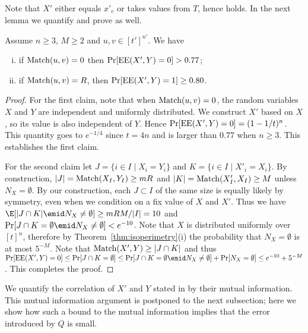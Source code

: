 Note that $X'$ either equals $x'_e$ or takes values from $T$,
hence  holds. In the next lemma we quantify and
prove  as well.

\begin{lemma}
\label{lem:error}
Assume $n\ge3$, $M\ge2$ and $u,v\in[t']^{n'}$. We have
\begin{enumerate}[(i)]
\item 
if $\operatorname{Match}(u,v)=0$ then $\Pr[\operatorname{EE}(X',Y)=0] > 0.77$;
\item 
if $\operatorname{Match}(u,v)=R$, then
$\Pr[\operatorname{EE}(X', Y)=1] \ge 0.80$.
\end{enumerate}
\end{lemma}

\begin{proof}
For the first claim, note that when $\operatorname{Match}(u,v) = 0$, the
random variables $X$ and $Y$ are independent and uniformly
distributed. We construct $X'$ based on $X$, so its value is
also independent of $Y$. Hence $\Pr[\operatorname{EE}(X',Y)=0]=(1-1/t)^n$.
This quantity goes to $e^{-1/4}$ since $t=4n$ and is larger than
$0.77$ when $n\geq 3$. This establishes the first claim.

For the second claim let $J = \{i\in I\mid X_i=Y_i\}$ and
$K=\{i\in I\mid X'_i = X_i\}$. By construction,
$|J|=\operatorname{Match}(X_{I},Y_{I})\ge mR$ and $|K|=\operatorname{Match}(X'_{I}, X_I)
\geq M$ unless $N_X=\emptyset$. By our construction, each
$J\subset I$ of the same size is equally likely by symmetry,
even when we condition on a fix value of $X$ and $X'$. Thus we
have $\E[|J\cap K|\emid N_X\ne\emptyset]\ge mRM/|I|=10$ and
$\Pr[J\cap K=\emptyset\emid N_X\ne\emptyset]<e^{-10}$. Note that
$X$ is distributed uniformly over $[t]^n$, therefore by
Theorem~\ref{thm:isoperimetry}(i) the probability that
$N_X=\emptyset$ is at most $5^{-M}$. Note that
$\operatorname{Match}(X',Y)\ge|J\cap K|$ and thus
$\Pr[\EE(X',Y)=0]\le\Pr[J\cap K=\emptyset]\le\Pr[J\cap
K=\emptyset\emid N_X\ne\emptyset] +\Pr[N_X=\emptyset]\le
e^{-10}+5^{-M}$. This completes the proof.
\end{proof}

We quantify the correlation of $X'$ and $Y$ stated in  
by their mutual information. This mutual information argument is
postponed to the next subsection; here we show how such a bound
to the mutual information implies that the error introduced by $Q$ is
small.


